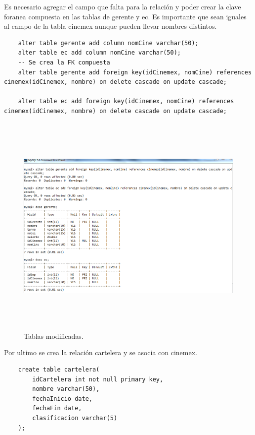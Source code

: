 \documentclass[12pt, titlepage]{article}
\begin{document}
    Es necesario agregar el campo que falta para la relación y poder crear la clave foranea compuesta en las tablas de gerente y ec. Es importante que sean iguales al campo de la tabla cinemex aunque pueden llevar nombres distintos.
     \begin{lstlisting}
    alter table gerente add column nomCine varchar(50);
    alter table ec add column nomCine varchar(50);
    -- Se crea la FK compuesta
    alter table gerente add foreign key(idCinemex, nomCine) references cinemex(idCinemex, nombre) on delete cascade on update cascade;
    
    alter table ec add foreign key(idCinemex, nomCine) references cinemex(idCinemex, nombre) on delete cascade on update cascade;
    \end{lstlisting}
    \begin{figure}[H]
        \begin{center}
            \includegraphics[width=16cm, height=11cm]{img/casi.png}
            \caption{Tablas modificadas.}
            \label{fig:modificaciones}
        \end{center}
    \end{figure}
    Por ultimo se crea la relación cartelera y se asocia con cinemex.
    \begin{lstlisting}
    create table cartelera(
        idCartelera int not null primary key,
        nombre varchar(50),
        fechaInicio date,
        fechaFin date,
        clasificacion varchar(5)
    );
    \end{lstlisting}
\end{document}
